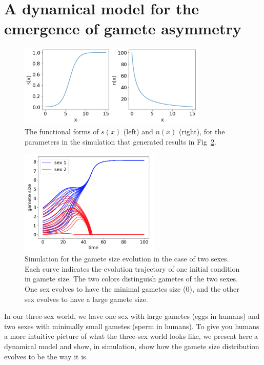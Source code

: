 

\section*{A dynamical model for the emergence of gamete asymmetry}


\begin{figure}[htb!]
    \centering
    \includegraphics[width = 0.8\textwidth]{vickysFigs/2_sex_funForm}
    \caption{The functional forms of $s(x)$ (left) and $n(x)$ (right), for the parameters in the simulation that generated results in Fig~\ref{fig:2sexRun1}.}
    \label{fig:2sexFun1}
\end{figure}

\begin{figure}[htb!]
    \centering
    \includegraphics[width = 0.6\textwidth]{vickysFigs/2_sex_run1}
    \caption{Simulation for the gamete size evolution in the case of two sexes. Each curve indicates the evolution trajectory of one initial condition in gamete size. The two colors distinguish gametes of the two sexes. One sex evolves to have the minimal gametes size ($0$), and the other sex evolves to have a large gamete size.}
    \label{fig:2sexRun1}
\end{figure}

In our three-sex world, we have one sex with large gametes (eggs in humans) and two sexes with minimally small gametes (sperm in humans). To give you humans a more intuitive picture of what the three-sex world looks like, we present here a dynamical model and show, in simulation, show how the gamete size distribution evolves to be the way it is. 

